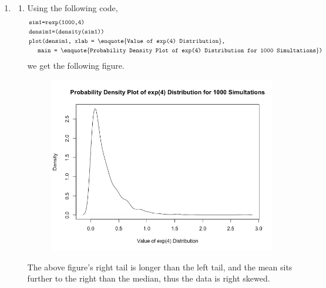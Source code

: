\documentclass[a4paper]{article}
\newcommand{\code}{\texttt}
\begin{document}
\begin{enumerate}
	\item
	\begin{enumerate}

		\item Using the following code,
		\begin{align*}
			&\code{sim1=rexp(1000,4)}\\
			&\code{densim1=(density(sim1))}\\
			&\code{plot(densim1, xlab = }\text{\enquote{\code{Value of exp(4) Distribution}}}\code{,} \\
			& \hspace{5mm}\code{main = }\text{\enquote{\code{Probability Density Plot of exp(4) Distribution for 1000 Simultations}}}\code{)}\\
		\end{align*}
		we get the following figure.
		\bigbreak
		\begin{figure}[h!]
			\begin{center}
				\includegraphics[width=0.6\linewidth]{a1.png}
			\end{center}
		\end{figure}

		The above figure's right tail is longer than the left tail, and the mean sits further to the right than the median, thus the data is right skewed.

		\pagebreak


\end{enumerate}
\end{enumerate}
\end{document}
